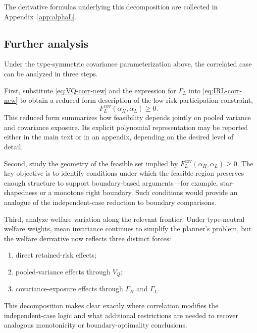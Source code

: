 \documentclass[a4paper,12pt]{article}
\theoremstyle{definition}
\theoremstyle{remark}
\newcommand{\1}{\mathbf{1}}
\begin{document}
The derivative formulas underlying this decomposition are collected in
Appendix~\ref{app:alphaL}.

\subsection{Further analysis}

Under the type-symmetric covariance parameterization above, the correlated case
can be analyzed in three steps.

First, substitute \eqref{eq:VQ-corr-new} and the expression for \(\Gamma_L\)
into \eqref{eq:IRL-corr-new} to obtain a reduced-form description of the
low-risk participation constraint,
\[
F_L^{\mathrm{cov}}(\alpha_H,\alpha_L)\ge 0.
\]
This reduced form summarizes how feasibility depends jointly on pooled variance
and covariance exposure. Its explicit polynomial representation may be reported
either in the main text or in an appendix, depending on the desired level of
detail.

Second, study the geometry of the feasible set implied by
\(F_L^{\mathrm{cov}}(\alpha_H,\alpha_L)\ge 0\). The key objective is to
identify conditions under which the feasible region preserves enough structure
to support boundary-based arguments---for example, star-shapedness or a
monotone right boundary. Such conditions would provide an analogue of the
independent-case reduction to boundary comparisons.

Third, analyze welfare variation along the relevant frontier. Under type-neutral
welfare weights, mean invariance continues to simplify the planner's problem,
but the welfare derivative now reflects three distinct forces:
\begin{enumerate}[leftmargin=2em]
    \item direct retained-risk effects;
    \item pooled-variance effects through \(V_Q\);
    \item covariance-exposure effects through \(\Gamma_H\) and \(\Gamma_L\).
\end{enumerate}
This decomposition makes clear exactly where correlation modifies the
independent-case logic and what additional restrictions are needed to recover
analogous monotonicity or boundary-optimality conclusions.

\end{document}
